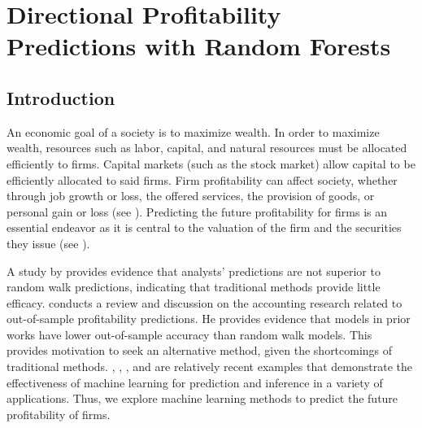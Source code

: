 \chapter{Directional Profitability Predictions with Random Forests} \label{Chapter:ABIS}

\section{Introduction}


An economic goal of a society is to maximize wealth. In order to maximize wealth, resources such as labor, capital, and natural resources must be allocated efficiently to firms. Capital markets (such as the stock market) allow capital to be efficiently allocated to said firms. Firm profitability can affect society, whether through job growth or loss, the offered services, the provision of goods, or personal gain or loss (see \cite{IntAccBook}).  Predicting the future profitability for firms is an essential endeavor as it is central to the valuation of the firm and the securities they issue (see \cite{Monahan}). 

A study by \cite{Bradshaw} provides evidence that analysts' predictions are not superior to random walk predictions, indicating that traditional methods provide little efficacy. \cite{Monahan} conducts a review and discussion on the accounting research related to out-of-sample profitability predictions.  He provides evidence that models in prior works have lower out-of-sample accuracy than random walk models. This provides motivation to seek an alternative method, given the shortcomings of traditional methods.   \cite{ABIS:ML:EX1},  \cite{ABIS:ML:EX2},  \cite{ABIS:ML:EX3},  and \cite{ABIS:ML:EX4} are relatively recent examples that demonstrate the effectiveness of machine learning for prediction and inference in a variety of applications.  Thus, we explore machine learning methods to predict the future profitability of firms.
 

